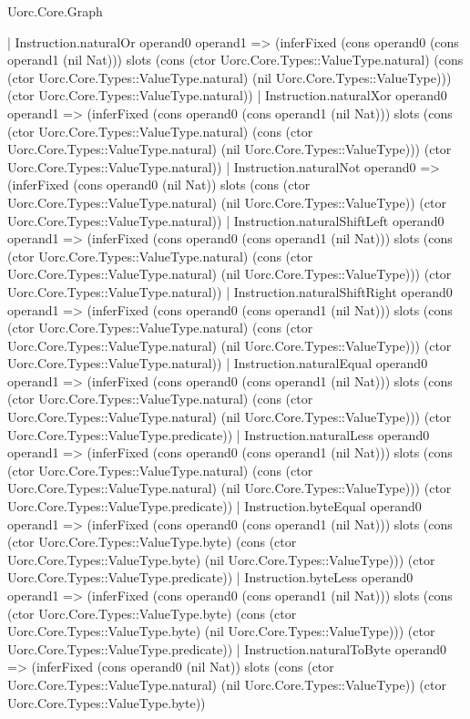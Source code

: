 \begin{lexlean}{Uorc.Core.Graph}
\begin{semanticmodule}
{    | Instruction.naturalOr operand0 operand1 => (inferFixed (cons operand0 (cons operand1 (nil Nat))) slots (cons (ctor Uorc.Core.Types::ValueType.natural) (cons (ctor Uorc.Core.Types::ValueType.natural) (nil Uorc.Core.Types::ValueType))) (ctor Uorc.Core.Types::ValueType.natural))
    | Instruction.naturalXor operand0 operand1 => (inferFixed (cons operand0 (cons operand1 (nil Nat))) slots (cons (ctor Uorc.Core.Types::ValueType.natural) (cons (ctor Uorc.Core.Types::ValueType.natural) (nil Uorc.Core.Types::ValueType))) (ctor Uorc.Core.Types::ValueType.natural))
    | Instruction.naturalNot operand0 => (inferFixed (cons operand0 (nil Nat)) slots (cons (ctor Uorc.Core.Types::ValueType.natural) (nil Uorc.Core.Types::ValueType)) (ctor Uorc.Core.Types::ValueType.natural))
    | Instruction.naturalShiftLeft operand0 operand1 => (inferFixed (cons operand0 (cons operand1 (nil Nat))) slots (cons (ctor Uorc.Core.Types::ValueType.natural) (cons (ctor Uorc.Core.Types::ValueType.natural) (nil Uorc.Core.Types::ValueType))) (ctor Uorc.Core.Types::ValueType.natural))
    | Instruction.naturalShiftRight operand0 operand1 => (inferFixed (cons operand0 (cons operand1 (nil Nat))) slots (cons (ctor Uorc.Core.Types::ValueType.natural) (cons (ctor Uorc.Core.Types::ValueType.natural) (nil Uorc.Core.Types::ValueType))) (ctor Uorc.Core.Types::ValueType.natural))
    | Instruction.naturalEqual operand0 operand1 => (inferFixed (cons operand0 (cons operand1 (nil Nat))) slots (cons (ctor Uorc.Core.Types::ValueType.natural) (cons (ctor Uorc.Core.Types::ValueType.natural) (nil Uorc.Core.Types::ValueType))) (ctor Uorc.Core.Types::ValueType.predicate))
    | Instruction.naturalLess operand0 operand1 => (inferFixed (cons operand0 (cons operand1 (nil Nat))) slots (cons (ctor Uorc.Core.Types::ValueType.natural) (cons (ctor Uorc.Core.Types::ValueType.natural) (nil Uorc.Core.Types::ValueType))) (ctor Uorc.Core.Types::ValueType.predicate))
    | Instruction.byteEqual operand0 operand1 => (inferFixed (cons operand0 (cons operand1 (nil Nat))) slots (cons (ctor Uorc.Core.Types::ValueType.byte) (cons (ctor Uorc.Core.Types::ValueType.byte) (nil Uorc.Core.Types::ValueType))) (ctor Uorc.Core.Types::ValueType.predicate))
    | Instruction.byteLess operand0 operand1 => (inferFixed (cons operand0 (cons operand1 (nil Nat))) slots (cons (ctor Uorc.Core.Types::ValueType.byte) (cons (ctor Uorc.Core.Types::ValueType.byte) (nil Uorc.Core.Types::ValueType))) (ctor Uorc.Core.Types::ValueType.predicate))
    | Instruction.naturalToByte operand0 => (inferFixed (cons operand0 (nil Nat)) slots (cons (ctor Uorc.Core.Types::ValueType.natural) (nil Uorc.Core.Types::ValueType)) (ctor Uorc.Core.Types::ValueType.byte))
}
\end{semanticmodule}
\end{lexlean}
